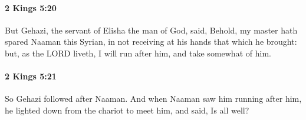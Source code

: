 		\paragraph{2 Kings 5:20} %
			\label{2KINGS-5-20}

			But Gehazi, the servant of Elisha the man of God, said, Behold, my master hath spared Naaman this Syrian, in not receiving at his hands that which he brought: but, as the LORD liveth, I will run after him, and take somewhat of him.


		\paragraph{2 Kings 5:21} %
			\label{2KINGS-5-21}

			So Gehazi followed after Naaman. And when Naaman saw him running after him, he lighted down from the chariot to meet him, and said, Is all well?

